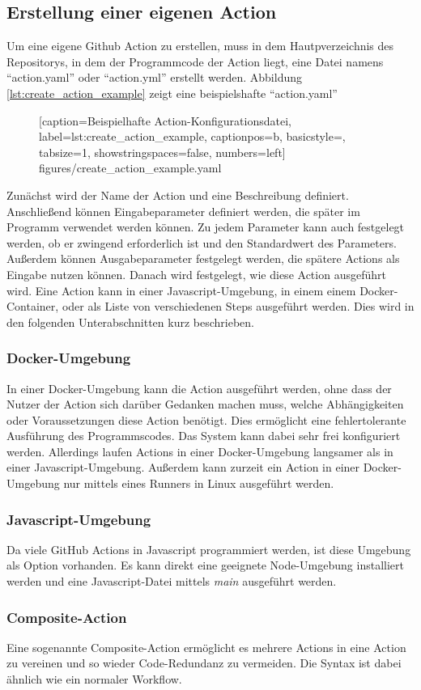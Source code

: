 \subsection{Erstellung einer eigenen Action}
Um eine eigene Github Action zu erstellen, muss in dem Hautpverzeichnis des Repositorys, in dem der Programmcode der Action liegt, eine Datei namens \enquote{action.yaml} oder \enquote{action.yml} erstellt werden. Abbildung \ref{lst:create_action_example} zeigt eine beispielshafte \enquote{action.yaml}
	\begin{figure}[h!]
			
			[caption={Beispielhafte Action-Konfigurationsdatei},
			label={lst:create_action_example},
			captionpos=b, basicstyle=\footnotesize, tabsize=1, showstringspaces=false,  numbers=left]
			{figures/create_action_example.yaml}
		\end{figure}
Zunächst wird der Name der Action und eine Beschreibung definiert. Anschließend können Eingabeparameter definiert werden, die später im Programm verwendet werden können. Zu jedem Parameter kann auch festgelegt werden, ob er zwingend erforderlich ist und den Standardwert des Parameters. Außerdem können Ausgabeparameter festgelegt werden, die spätere Actions als Eingabe nutzen können. Danach wird festgelegt, wie diese Action ausgeführt wird. Eine Action kann in einer Javascript-Umgebung, in einem einem Docker-Container, oder als Liste von verschiedenen Steps ausgeführt werden. Dies wird in den folgenden Unterabschnitten kurz beschrieben.
\subsubsection{Docker-Umgebung}
In einer Docker-Umgebung kann die Action ausgeführt werden, ohne dass der Nutzer der Action sich darüber Gedanken machen muss, welche Abhängigkeiten oder Voraussetzungen diese Action benötigt. Dies ermöglicht eine fehlertolerante Ausführung des Programmscodes. Das System kann dabei sehr frei konfiguriert werden. Allerdings laufen Actions in einer Docker-Umgebung langsamer als in einer Javascript-Umgebung. Außerdem kann zurzeit ein Action in einer Docker-Umgebung nur mittels eines Runners in Linux ausgeführt werden.

\subsubsection{Javascript-Umgebung}
Da viele GitHub Actions in Javascript programmiert werden, ist diese Umgebung als Option vorhanden. Es kann direkt eine geeignete Node-Umgebung installiert werden und eine Javascript-Datei mittels \textit{main} ausgeführt werden. 

\subsubsection{Composite-Action}
Eine sogenannte Composite-Action ermöglicht es mehrere Actions in eine Action zu vereinen und so wieder Code-Redundanz zu vermeiden. Die Syntax ist dabei ähnlich wie ein normaler Workflow. 
